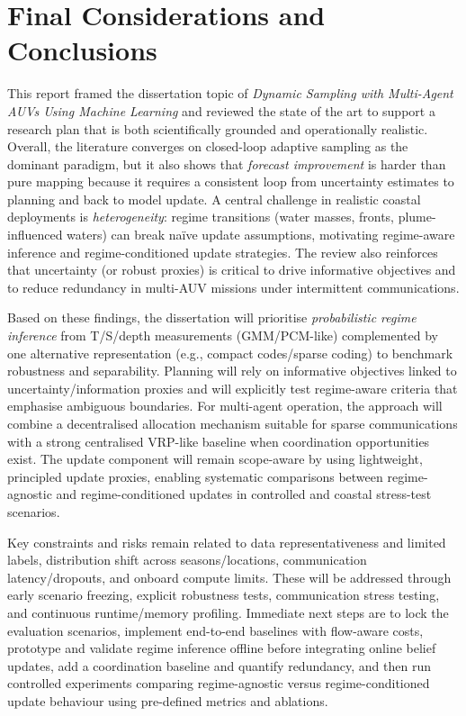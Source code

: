 
\chapter{Final Considerations and Conclusions} \label{chap:conclusions}

This report framed the dissertation topic of \emph{Dynamic Sampling with Multi-Agent AUVs Using Machine Learning} and reviewed the state of the art to support a research plan that is both scientifically grounded and operationally realistic. Overall, the literature converges on closed-loop adaptive sampling as the dominant paradigm, but it also shows that \emph{forecast improvement} is harder than pure mapping because it requires a consistent loop from uncertainty estimates to planning and back to model update. A central challenge in realistic coastal deployments is \emph{heterogeneity}: regime transitions (water masses, fronts, plume-influenced waters) can break naïve update assumptions, motivating regime-aware inference and regime-conditioned update strategies. The review also reinforces that uncertainty (or robust proxies) is critical to drive informative objectives and to reduce redundancy in multi-AUV missions under intermittent communications.

Based on these findings, the dissertation will prioritise \emph{probabilistic regime inference} from T/S/depth measurements (GMM/PCM-like) complemented by one alternative representation (e.g., compact codes/sparse coding) to benchmark robustness and separability. Planning will rely on informative objectives linked to uncertainty/information proxies and will explicitly test regime-aware criteria that emphasise ambiguous boundaries. For multi-agent operation, the approach will combine a decentralised allocation mechanism suitable for sparse communications with a strong centralised VRP-like baseline when coordination opportunities exist. The update component will remain scope-aware by using lightweight, principled update proxies, enabling systematic comparisons between regime-agnostic and regime-conditioned updates in controlled and coastal stress-test scenarios.

Key constraints and risks remain related to data representativeness and limited labels, distribution shift across seasons/locations, communication latency/dropouts, and onboard compute limits. These will be addressed through early scenario freezing, explicit robustness tests, communication stress testing, and continuous runtime/memory profiling. Immediate next steps are to lock the evaluation scenarios, implement end-to-end baselines with flow-aware costs, prototype and validate regime inference offline before integrating online belief updates, add a coordination baseline and quantify redundancy, and then run controlled experiments comparing regime-agnostic versus regime-conditioned update behaviour using pre-defined metrics and ablations.

